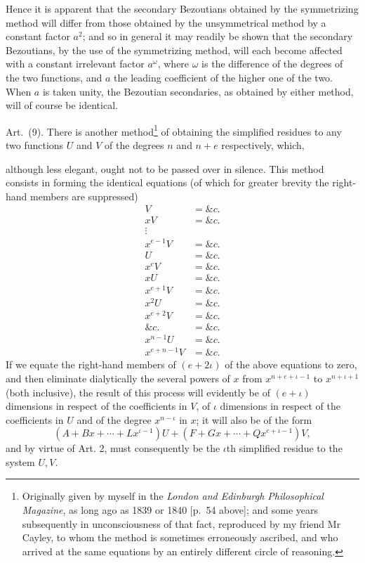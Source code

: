 \documentclass[11pt]{article}
\newcommand{\sourcepage}[1]{\marginpar{\scriptsize p.~#1}}
\newcommand{\art}[1]{\par\smallskip\noindent Art.~(#1).\quad}
\begin{document}
Hence it is apparent that the secondary Bezoutians obtained by the symmetrizing method will differ from those obtained by the unsymmetrical method by a constant factor $a^2$; and so in general it may readily be shown that the secondary Bezoutians, by the use of the symmetrizing method, will each become affected with a constant irrelevant factor $a^\omega$, where $\omega$ is the difference of the degrees of the two functions, and $a$ the leading coefficient of the higher one of the two. When $a$ is taken unity, the Bezoutian secondaries, as obtained by either method, will of course be identical.

\art{9} There is another method\footnote{Originally given by myself in the \emph{London and Edinburgh Philosophical Magazine}, as long ago as 1839 or 1840 [p.~54 above]; and some years subsequently in unconsciousness of that fact, reproduced by my friend Mr Cayley, to whom the method is sometimes erroneously ascribed, and who arrived at the same equations by an entirely different circle of reasoning.} of obtaining the simplified residues to any two functions $U$ and $V$ of the degrees $n$ and $n+e$ respectively, which,

\sourcepage{451}
although less elegant, ought not to be passed over in silence. This method consists in forming the identical equations (of which for greater brevity the right-hand members are suppressed)
\[
\begin{array}{rl}
V&=\&c.\\
xV&=\&c.\\
\vdots&\\
x^{e-1}V&=\&c.\\
U&=\&c.\\
x^eV&=\&c.\\
xU&=\&c.\\
x^{e+1}V&=\&c.\\
x^2U&=\&c.\\
x^{e+2}V&=\&c.\\
\&c.&=\&c.\\
x^{n-1}U&=\&c.\\
x^{e+n-1}V&=\&c.
\end{array}
\]
If we equate the right-hand members of $(e+2\iota)$ of the above equations to zero, and then eliminate dialytically the several powers of $x$ from $x^{n+e+\iota-1}$ to $x^{n+\iota+1}$ (both inclusive), the result of this process will evidently be of $(e+\iota)$ dimensions in respect of the coefficients in $V$, of $\iota$ dimensions in respect of the coefficients in $U$ and of the degree $x^{n-\iota}$ in $x$; it will also be of the form
\[
(A+Bx+\cdots+Lx^{\iota-1})U+(F+Gx+\cdots+Qx^{e+\iota-1})V,
\]
and by virtue of Art. 2, must consequently be the $\iota$th simplified residue to the system $U,V$.
\end{document}
